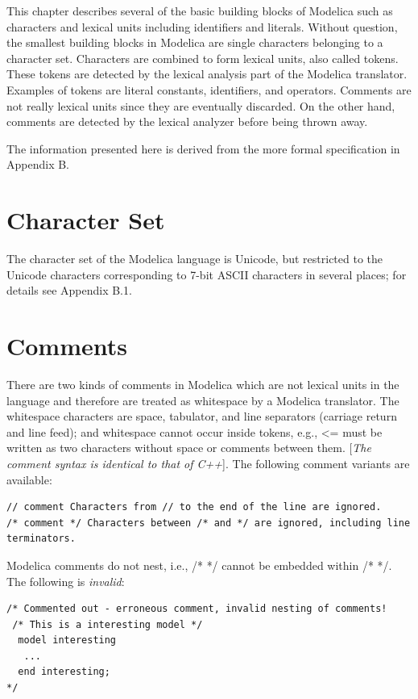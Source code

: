 \documentclass[10pt,a4paper]{report}
\def\Mcomment#1{{[}\emph{#1}{]}}
\begin{document}
This chapter describes several of the basic building blocks of Modelica
such as characters and lexical units including identifiers and literals.
Without question, the smallest building blocks in Modelica are single
characters belonging to a character set. Characters are combined to form
lexical units, also called tokens. These tokens are detected by the
lexical analysis part of the Modelica translator. Examples of tokens are
literal constants, identifiers, and operators. Comments are not really
lexical units since they are eventually discarded. On the other hand,
comments are detected by the lexical analyzer before being thrown away.

The information presented here is derived from the more formal
specification in Appendix B.

\section{Character Set}

The character set of the Modelica language is Unicode, but restricted to
the Unicode characters corresponding to 7-bit ASCII characters in
several places; for details see Appendix B.1.

\section{Comments}

There are two kinds of comments in Modelica which are not lexical units
in the language and therefore are treated as whitespace by a Modelica
translator. The whitespace characters are space, tabulator, and line
separators (carriage return and line feed); and whitespace cannot occur
inside tokens, e.g., \textless{}= must be written as two characters
without space or comments between them. \Mcomment{The comment syntax is
identical to that of C++}. The following comment variants are
available:

\begin{lstlisting}[language=modelica]
// comment Characters from // to the end of the line are ignored.
/* comment */ Characters between /* and */ are ignored, including line terminators.
\end{lstlisting}
Modelica comments do not nest, i.e., /* */ cannot be embedded within /* */. The following is \emph{invalid}:
\begin{lstlisting}[language=modelica]
/* Commented out - erroneous comment, invalid nesting of comments!
 /* This is a interesting model */
  model interesting
   ...
  end interesting;
*/
\end{lstlisting}
\end{document}
